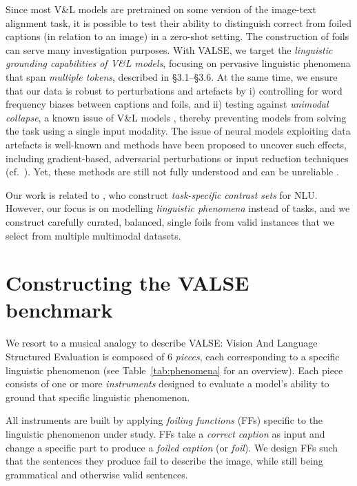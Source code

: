 \documentclass[11pt]{article}
\newcommand{\dataset}{VALSE}
\begin{document}
Since most V\&L models are pretrained on some version of the image-text alignment task, it is possible to test their ability to distinguish correct from foiled captions (in relation to an image) in a zero-shot setting. The construction of foils can serve many investigation purposes. With \dataset{}, we target the \textit{linguistic grounding capabilities of V\&L models}, focusing
on pervasive linguistic phenomena that span \textit{multiple tokens}, described in \S 3.1--\S3.6.
At the same time, we ensure that our data is robust to 
perturbations and artefacts by
i) controlling for word frequency biases between captions and foils, and ii) testing against \emph{unimodal collapse}, a known
issue of
V\&L models \cite{goyal2017making,madhyastha-etal-2018-defoiling}, thereby preventing models from solving the task using a single input modality.
The issue of neural models exploiting data artefacts is well-known \citep{gururangan-etal-2018-annotation,jia-etal-2019-certified,wang-etal-2020-gradient,HE2021104194} and methods have been proposed to uncover such effects,
including gradient-based, adversarial perturbations or input reduction techniques 
(cf.\ \citealp{wallace-etal-2020-interpreting}).
Yet, these methods are still not fully understood \cite{HE2021104194} and can be unreliable \citep{wang-etal-2020-gradient}.

Our work is related to \citet{gardner-etal-2020-evaluating}, who construct \textit{task-specific} \textit{contrast sets} for NLU.
However, our focus is on modelling \textit{linguistic phenomena} instead of tasks, and we construct carefully curated, balanced, single foils from valid instances that we select from multiple multimodal datasets.






\section{Constructing the \dataset{} benchmark} \label{sec:construct_bench}


We resort to a musical analogy to describe \dataset{}: Vision And Language Structured Evaluation is composed of 6 \emph{pieces}, each corresponding to a specific linguistic phenomenon (see Table~\ref{tab:phenomena} for an overview). Each piece consists of one or more \emph{instruments} designed to evaluate a model's ability to ground that specific linguistic phenomenon.


All instruments are built by applying \textit{foiling functions} (FFs) specific to the linguistic phenomenon under study. FFs take a \textit{correct caption} as input and change a specific part to produce a \textit{foiled caption} (or \textit{foil}). We design FFs such that the sentences they produce fail to describe the image, while still being grammatical and otherwise valid sentences. 
\end{document}

